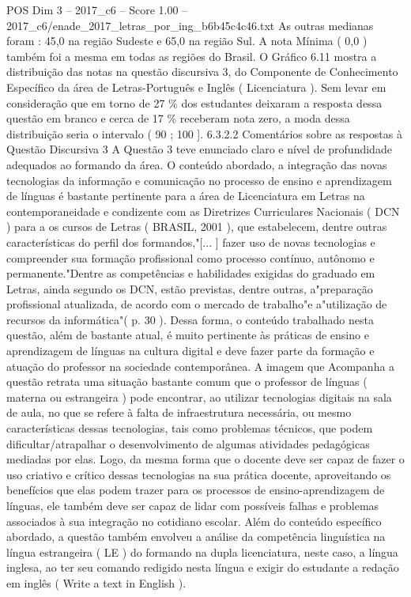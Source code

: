 \begin{textsample}{POS Dim 3 – 2017\_c6 – Score 1.00 – 2017\_c6/enade\_2017\_letras\_por\_ing\_b6b45c4c46.txt}
As outras medianas foram : 45,0 na região Sudeste e 65,0 na região Sul.
A nota Mínima ( 0,0 ) também foi a mesma em todas as regiões do Brasil.
O Gráfico 6.11 mostra a distribuição das notas na questão discursiva 3, do Componente de Conhecimento Específico da área de Letras-Português e Inglês ( Licenciatura ).
Sem levar em consideração que em torno de 27 \% dos estudantes deixaram a resposta dessa questão em branco e cerca de 17 \% receberam nota zero, a moda dessa distribuição seria o intervalo ( 90 ; 100 ]. 6.3.2.2 Comentários sobre as respostas à Questão Discursiva 3 A Questão 3 teve enunciado claro e nível de profundidade adequados ao formando da área.
O conteúdo abordado, a integração das novas tecnologias da informação e comunicação no processo de ensino e aprendizagem de línguas é bastante pertinente para a área de Licenciatura em Letras na contemporaneidade e condizente com as Diretrizes Curriculares Nacionais ( DCN ) para a os cursos de Letras ( BRASIL, 2001 ), que estabelecem, dentre outras características do perfil dos formandos,"[... ] fazer uso de novas tecnologias e compreender sua formação profissional como processo contínuo, autônomo e permanente."Dentre as competências e habilidades exigidas do graduado em Letras, ainda segundo os DCN, estão previstas, dentre outras, a"preparação profissional atualizada, de acordo com o mercado de trabalho"e a"utilização de recursos da informática"( p. 30 ).
Dessa forma, o conteúdo trabalhado nesta questão, além de bastante atual, é muito pertinente às práticas de ensino e aprendizagem de línguas na cultura digital e deve fazer parte da formação e atuação do professor na sociedade contemporânea.
A imagem que Acompanha a questão retrata uma situação bastante comum que o professor de línguas ( materna ou estrangeira ) pode encontrar, ao utilizar tecnologias digitais na sala de aula, no que se refere à falta de infraestrutura necessária, ou mesmo características dessas tecnologias, tais como problemas técnicos, que podem dificultar/atrapalhar o desenvolvimento de algumas atividades pedagógicas mediadas por elas.
Logo, da mesma forma que o docente deve ser capaz de fazer o uso criativo e crítico dessas tecnologias na sua prática docente, aproveitando os benefícios que elas podem trazer para os processos de ensino-aprendizagem de línguas, ele também deve ser capaz de lidar com possíveis falhas e problemas associados à sua integração no cotidiano escolar.
Além do conteúdo específico abordado, a questão também envolveu a análise da competência linguística na língua estrangeira ( LE ) do formando na dupla licenciatura, neste caso, a língua inglesa, ao ter seu comando redigido nesta língua e exigir do estudante a redação em inglês ( Write a text in English ).

\end{textsample}
